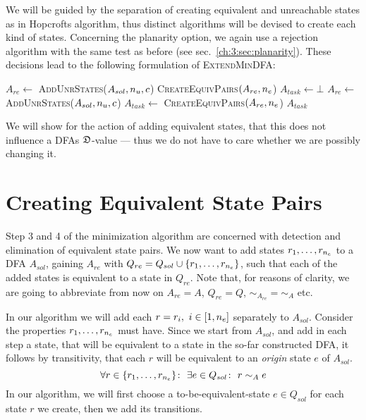 We will be guided by the separation of creating equivalent and unreachable states as in Hopcrofts algorithm, thus distinct algorithms will be devised to create each kind of states. Concerning the planarity option, we again use a rejection algorithm with the same test as before (see sec.~\ref{ch:3:sec:planarity}). These decisions lead to the following formulation of \textsc{ExtendMinDFA}:
\newpage
\vspace{0.2cm}
\begin{spacing}{1}
	\begin{algorithmic}[1]
			\State $A_{re} \gets$ \textsc{AddUnrStates}($A_{sol}, {n_u}, c$)
			\State \Return \textsc{CreateEquivPairs}$(A_{re}, {n_e}$)
		\Else
			\State $A_{task} \gets \bot$
				\State $A_{re} \gets$ \textsc{AddUnrStates}($A_{sol}, {n_u}, c$)
				\State $A_{task} \gets$ \textsc{CreateEquivPairs}$(A_{re}, {n_e}$)
			\EndWhile
			\State \Return $A_{task}$
		\EndIf
		\EndFunction
	\end{algorithmic}
\end{spacing}
\vspace{0.2cm}
\noindent We will show for the action of adding equivalent states, that this does not influence a DFAs $\mathfrak{D}$-value --- thus we do not have to care whether we are possibly changing it.

\section{Creating Equivalent State Pairs}

Step 3 and 4 of the minimization algorithm are concerned with detection and elimination of equivalent state pairs. We now want to add states $r_1,\ldots,r_{n_e}$ to a DFA $A_{sol}$, gaining $A_{re}$ with $Q_{re} = Q_{sol} \cup \{r_1,\ldots,r_{n_e}\}$, such that each of the added states is equivalent to a state in $Q_{re}$. Note that, for reasons of clarity, we are going to abbreviate from now on $A_{re} = A$, $Q_{re} = Q$, $\sim_{A_{re}} = \sim_A$ etc.

In our algorithm we will add each $r = r_i,\ i\in[1,{n_e}]$ separately to $A_{sol}$. Consider the properties $r_1,\ldots,r_{n_e}$ must have. Since we start from $A_{sol}$, and add in each step a state, that will be equivalent to a state in the so-far constructed DFA, it follows by transitivity, that each $r$ will be equivalent to an \emph{origin} state $e$ of $A_{sol}$.
\[
	\forall r \in \{r_1,\ldots,r_{{n_e}}\} \colon\ \exists e \in Q_{sol}\colon\ r \sim_A e
\]
In our algorithm, we will first choose a to-be-equivalent-state $e\in Q_{sol}$ for each state $r$ we create, then we add its transitions.

